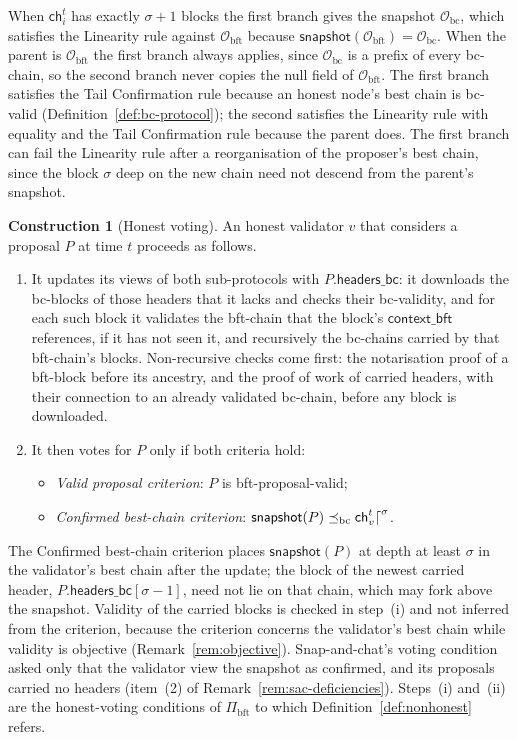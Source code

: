 \documentclass[11pt,a4paper]{article}
\theoremstyle{definition}
\newtheorem{construction}[theorem]{Construction}
\newcommand{\bc}{\mathrm{bc}}
\newcommand{\bft}{\mathrm{bft}}
\newcommand{\Origin}{\mathcal{O}}
\newcommand{\Obc}{\Origin_{\bc}}
\newcommand{\Obft}{\Origin_{\bft}}
\newcommand{\preceqbc}{\preceq_{\bc}}
\newcommand{\ch}{\mathsf{ch}}
\newcommand{\Pibft}{\Pi_{\bft}}
\newcommand{\contextbft}{\mathsf{context\_bft}}
\newcommand{\headersbc}{\mathsf{headers\_bc}}
\newcommand{\snapshot}{\mathsf{snapshot}}
\begin{document}
When $\ch_i^t$ has exactly $\sigma + 1$ blocks the first branch gives the
snapshot $\Obc$, which satisfies the Linearity rule against $\Obft$ because
$\snapshot(\Obft) = \Obc$. When the parent is $\Obft$ the first branch always
applies, since $\Obc$ is a prefix of every bc-chain, so the second branch
never copies the null field of $\Obft$. The first branch satisfies the Tail
Confirmation rule because an honest node's best chain is bc-valid
(Definition~\ref{def:bc-protocol}); the second satisfies the Linearity rule
with equality and the Tail Confirmation rule because the parent does. The
first branch can fail the Linearity rule after a reorganisation of the
proposer's best chain, since the block $\sigma$ deep on the new chain need
not descend from the parent's snapshot.

\begin{construction}[Honest voting]\label{def:honest-voting}
An honest validator $v$ that considers a proposal $P$ at time $t$ proceeds as
follows.
\begin{enumerate}[label=(\roman*)]
\item It updates its views of both sub-protocols with $P.\headersbc$: it
  downloads the bc-blocks of those headers that it lacks and checks their
  bc-validity, and for each such block it validates the bft-chain that the
  block's $\contextbft$ references, if it has not seen it, and recursively
  the bc-chains carried by that bft-chain's blocks. Non-recursive checks come
  first: the notarisation proof of a bft-block before its ancestry, and the
  proof of work of carried headers, with their connection to an already
  validated bc-chain, before any block is downloaded.
\item It then votes for $P$ only if both criteria hold:
  \begin{itemize}
  \item \emph{Valid proposal criterion}: $P$ is bft-proposal-valid;
  \item \emph{Confirmed best-chain criterion}:
    $\snapshot(P) \preceqbc \ch_v^t\trunc{\sigma}$.
  \end{itemize}
\end{enumerate}
\end{construction}

The Confirmed best-chain criterion places $\snapshot(P)$ at depth at least
$\sigma$ in the validator's best chain after the update; the block of the
newest carried header, $P.\headersbc[\sigma - 1]$, need not lie on that
chain, which may fork above the snapshot. Validity of the carried blocks is
checked in step~(i) and not inferred from the criterion, because the
criterion concerns the validator's best chain while validity is objective
(Remark~\ref{rem:objective}). Snap-and-chat's voting condition asked only
that the validator view the snapshot as confirmed, and its proposals carried
no headers (item~(2) of Remark~\ref{rem:sac-deficiencies}). Steps~(i)
and~(ii) are the honest-voting conditions of $\Pibft$ to which
Definition~\ref{def:nonhonest} refers.
\end{document}
